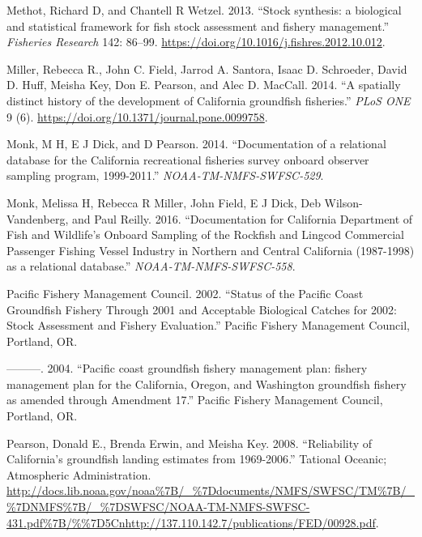 \documentclass[
  english,
  a4paper,
]{article}
\newlength{\cslhangindent}
\newlength{\cslentryspacingunit} %
\newenvironment{CSLReferences}[2] %
 {%
  \setlength{\parindent}{0pt}
  \ifodd #1
  \let\oldpar\par
  \def\par{\hangindent=\cslhangindent\oldpar}
  \fi
  \setlength{\parskip}{#2\cslentryspacingunit}
 }%
 {}
\begin{document}
\begin{CSLReferences}{1}{0}
\leavevmode{}%
Methot, Richard D, and Chantell R Wetzel. 2013. {``{Stock synthesis: a biological and statistical framework for fish stock assessment and fishery management}.''} \emph{Fisheries Research} 142: 86--99. \url{https://doi.org/10.1016/j.fishres.2012.10.012}.

\leavevmode{}%
Miller, Rebecca R., John C. Field, Jarrod A. Santora, Isaac D. Schroeder, David D. Huff, Meisha Key, Don E. Pearson, and Alec D. MacCall. 2014. {``{A spatially distinct history of the development of California groundfish fisheries}.''} \emph{PLoS ONE} 9 (6). \url{https://doi.org/10.1371/journal.pone.0099758}.

\leavevmode{}%
Monk, M H, E J Dick, and D Pearson. 2014. {``{Documentation of a relational database for the California recreational fisheries survey onboard observer sampling program, 1999-2011}.''} \emph{NOAA-TM-NMFS-SWFSC-529}.

\leavevmode{}%
Monk, Melissa H, Rebecca R Miller, John Field, E J Dick, Deb Wilson-Vandenberg, and Paul Reilly. 2016. {``{Documentation for California Department of Fish and Wildlife's Onboard Sampling of the Rockfish and Lingcod Commercial Passenger Fishing Vessel Industry in Northern and Central California (1987-1998) as a relational database}.''} \emph{NOAA-TM-NMFS-SWFSC-558}.

\leavevmode{}%
Pacific Fishery Management Council. 2002. {``{Status of the Pacific Coast Groundfish Fishery Through 2001 and Acceptable Biological Catches for 2002: Stock Assessment and Fishery Evaluation.}''} Pacific Fishery Management Council, Portland, OR.

\leavevmode{}%
---------. 2004. {``{Pacific coast groundfish fishery management plan: fishery management plan for the California, Oregon, and Washington groundfish fishery as amended through Amendment 17}.''} Pacific Fishery Management Council, Portland, OR.

\leavevmode{}%
Pearson, Donald E., Brenda Erwin, and Meisha Key. 2008. {``{Reliability of California's groundfish landing estimates from 1969-2006}.''} Tational Oceanic; Atmospheric Administration. \url{http://docs.lib.noaa.gov/noaa\%7B/_\%7Ddocuments/NMFS/SWFSC/TM\%7B/_\%7DNMFS\%7B/_\%7DSWFSC/NOAA-TM-NMFS-SWFSC-431.pdf\%7B/\%\%7D5Cnhttp://137.110.142.7/publications/FED/00928.pdf}.


\end{CSLReferences}
\end{document}
